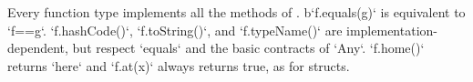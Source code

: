Every function type implements all the methods of .
b\xcd`f.equals(g)` is equivalent to \xcd`f==g`.  \xcd`f.hashCode()`, 
\xcd`f.toString()`, and \xcd`f.typeName()` are implementation-dependent, but
respect \xcd`equals` and the basic contracts of \xcd`Any`. 
\xcd`f.home()` returns \xcd`here` and \xcd`f.at(x)`
always returns true, as for structs.



